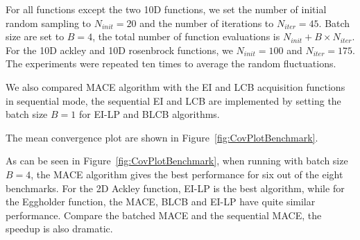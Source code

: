 For all functions except the two 10D functions, we set the number of initial
random sampling to $N_{init} = 20$ and the number of iterations to $N_{iter} =
45$. Batch size are set to $B = 4$, the total number of function evaluations is
$N_{init} + B \times N_{iter}$. For the 10D ackley and 10D rosenbrock functions, we
$N_{init} = 100$ and $N_{iter} = 175$. The experiments were repeated ten
times to average the random fluctuations. 

We also compared MACE algorithm with the EI and LCB acquisition functions in
sequential mode, the sequential EI and LCB are implemented by setting the batch
size $B = 1$ for EI-LP and BLCB algorithms.

The mean convergence plot are shown in Figure~\ref{fig:CovPlotBenchmark}.


As can be seen in Figure~\ref{fig:CovPlotBenchmark}, when running with batch
size $B = 4$, the MACE algorithm gives the best performance for six out of the
eight benchmarks. For the 2D Ackley function, EI-LP is the best algorithm,
while for the Eggholder function, the MACE, BLCB and EI-LP have quite similar
performance. Compare the batched MACE and the sequential MACE, the speedup is
also dramatic.


